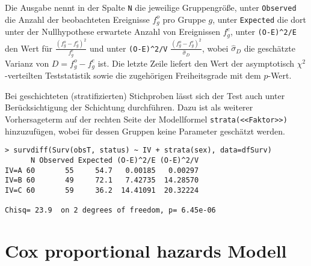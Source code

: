 Die Ausgabe nennt in der Spalte \lstinline!N! die jeweilige Gruppengröße, unter \lstinline!Observed! die Anzahl der beobachteten Ereignisse $f_{g}^{o}$ pro Gruppe $g$, unter \lstinline!Expected! die dort unter der Nullhypothese erwartete Anzahl von Ereignissen $f_{g}^{e}$, unter \lstinline!(O-E)^2/E! den Wert für $\frac{(f_{g}^{o} - f_{g}^{e})^{2}}{f_{g}^{e}}$ und unter \lstinline!(O-E)^2/V! $\frac{(f_{g}^{o} - f_{g}^{e})^{2}}{\hat{\sigma}_{D}}$, wobei $\hat{\sigma}_{D}$ die geschätzte Varianz von $D = f_{g}^{o} - f_{g}^{e}$ ist. Die letzte Zeile liefert den Wert der asymptotisch $\chi^{2}$-verteilten Teststatistik sowie die zugehörigen Freiheitsgrade mit dem $p$-Wert.

Bei geschichteten (stratifizierten) Stichproben lässt sich der Test auch unter Berücksichtigung der Schichtung durchführen. Dazu ist als weiterer Vorhersageterm auf der rechten Seite der Modellformel \lstinline!strata(<<Faktor>>)! hinzuzufügen, wobei für dessen Gruppen keine Parameter geschätzt werden.
\begin{lstlisting}
> survdiff(Surv(obsT, status) ~ IV + strata(sex), data=dfSurv)
      N Observed Expected (O-E)^2/E (O-E)^2/V
IV=A 60       55     54.7   0.00185   0.00297
IV=B 60       49     72.1   7.42735  14.28570
IV=C 60       59     36.2  14.41091  20.32224

Chisq= 23.9  on 2 degrees of freedom, p= 6.45e-06
\end{lstlisting}

\section{Cox proportional hazards Modell}
\label{sec:survCPH}


